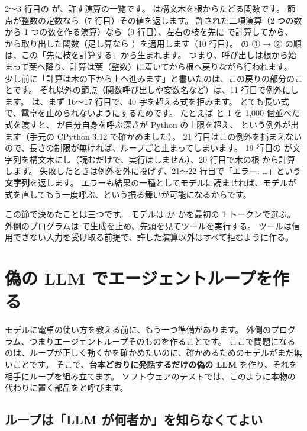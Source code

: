 2〜3 行目の  が、許す演算の一覧です。
 は構文木を根からたどる関数です。
節点が整数の定数なら（7 行目）その値を返します。
許された二項演算（2 つの数から 1 つの数を作る演算）なら（9 行目）、左右の枝を先に  で計算してから、 から取り出した関数（足し算なら ）を適用します（10 行目）。
の ① → ② の順は、この「先に枝を計算する」から生まれます。
つまり、呼び出しは根から始まって葉へ降り、計算は葉（整数）に着いてから根へ戻りながら行われます。
少し前に「計算は木の下から上へ進みます」と書いたのは、この戻りの部分のことです。
それ以外の節点（関数呼び出しや変数名など）は、11 行目で例外にします。
 は、まず 16〜17 行目で、40 字を超える式を拒みます。
とても長い式で、電卓を止められないようにするためです。
たとえば  と 1 を 1,000 個並べた式を渡すと、 が自分自身を呼ぶ深さが Python の上限を超え、 という例外が出ます（手元の CPython 3.12 で確かめました）。
21 行目はこの例外を捕まえないので、長さの制限が無ければ、ループごと止まってしまいます。
19 行目の  が文字列を構文木にし（読むだけで、実行はしません）、20 行目で木の根  から計算します。
失敗したときは例外を外に投げず、21〜22 行目で「エラー: …」という\textbf{文字列}を返します。
エラーも結果の一種としてモデルに読ませれば、モデルが式を直してもう一度呼ぶ、という振る舞いが可能になるからです。

この節で決めたことは三つです。
モデルは  か  かを最初の 1 トークンで選ぶ。
外側のプログラムは  で生成を止め、先頭を見てツールを実行する。
ツールは信用できない入力を受け取る前提で、許した演算以外はすべて拒むように作る。

\section{偽の LLM でエージェントループを作る}\label{sec:agent-loop}

モデルに電卓の使い方を教える前に、もう一つ準備があります。
外側のプログラム、つまりエージェントループそのものを作ることです。
ここで問題になるのは、ループが正しく動くかを確かめたいのに、確かめるためのモデルがまだ無いことです。
そこで、\textbf{台本どおりに発話するだけの偽の LLM} を作り、それを相手にループを組み立てます。
ソフトウェアのテストでは、このように本物の代わりに置く部品をと呼びます。

\subsection{ループは「LLM が何者か」を知らなくてよい}

